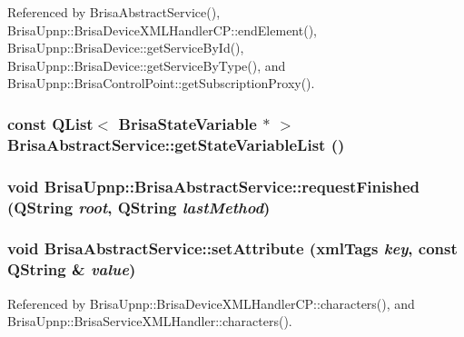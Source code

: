 Referenced by BrisaAbstractService(), BrisaUpnp::BrisaDeviceXMLHandlerCP::endElement(), BrisaUpnp::BrisaDevice::getServiceById(), BrisaUpnp::BrisaDevice::getServiceByType(), and BrisaUpnp::BrisaControlPoint::getSubscriptionProxy().\hypertarget{classBrisaUpnp_1_1BrisaAbstractService_ac410ff9af341b30ed287e81418a9776b}{
\subsubsection[{getStateVariableList}]{\setlength{\rightskip}{0pt plus 5cm}const QList$<$ {\bf BrisaStateVariable} $\ast$ $>$ BrisaAbstractService::getStateVariableList ()}}
\label{classBrisaUpnp_1_1BrisaAbstractService_ac410ff9af341b30ed287e81418a9776b}
\hypertarget{classBrisaUpnp_1_1BrisaAbstractService_a122d9f06ff46be2a8fa97d9d749f026d}{
\subsubsection[{requestFinished}]{\setlength{\rightskip}{0pt plus 5cm}void BrisaUpnp::BrisaAbstractService::requestFinished (QString {\em root}, \/  QString {\em lastMethod})}}
\label{classBrisaUpnp_1_1BrisaAbstractService_a122d9f06ff46be2a8fa97d9d749f026d}
\hypertarget{classBrisaUpnp_1_1BrisaAbstractService_a6a55bbf6efef5e3588b6dbd43a9feafd}{
\subsubsection[{setAttribute}]{\setlength{\rightskip}{0pt plus 5cm}void BrisaAbstractService::setAttribute ({\bf xmlTags} {\em key}, \/  const QString \& {\em value})}}
\label{classBrisaUpnp_1_1BrisaAbstractService_a6a55bbf6efef5e3588b6dbd43a9feafd}


Referenced by BrisaUpnp::BrisaDeviceXMLHandlerCP::characters(), and BrisaUpnp::BrisaServiceXMLHandler::characters().


